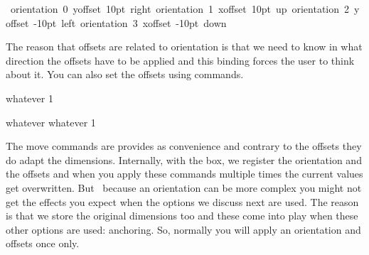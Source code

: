 \startbuffer
\hbox \bgroup \showboxes
          \hbox orientation 0 yoffset  10pt {right}
    \quad \hbox orientation 1 xoffset  10pt {up}
    \quad \hbox orientation 2 yoffset -10pt {left}
    \quad \hbox orientation 3 xoffset -10pt {down}
\egroup
\stopbuffer

\typebuffer[option=TEX]

\startlinecorrection
\getbuffer
\stoplinecorrection

The reason that offsets are related to orientation is that we need to know in
what direction the offsets have to be applied and this binding forces the user to
think about it. You can also set the offsets using commands.

\startbuffer
\setbox\scratchbox\hbox{whatever}%
1                                  \copy{} \boxorientation{}     \copy{} \boxxoffset    \scratchbox -15pt \copy{} \boxyoffset    \scratchbox -15pt \copy{}
\stopbuffer

\typebuffer[option=TEX]

\startlinecorrection
{}
\stoplinecorrection

\startbuffer
\setbox\scratchboxone\hbox{whatever}%
\setbox\scratchboxtwo\hbox{whatever}%
1 \boxxoffset \scratchboxone -15pt \copy{} \boxyoffset \scratchboxone -15pt \copy{} \boxxoffset \scratchboxone -15pt \copy{} \boxyoffset \scratchboxone -15pt \copy{} \boxxmove   \scratchboxtwo -15pt \copy{} \boxymove   \scratchboxtwo -15pt \copy{} \boxxmove   \scratchboxtwo -15pt \copy{} \boxymove   \scratchboxtwo -15pt \copy\scratchboxtwo
\stopbuffer

\typebuffer[option=TEX]

\startlinecorrection
{}
\stoplinecorrection

The move commands are provides as convenience and contrary to the offsets they do
adapt the dimensions. Internally, with the box, we register the orientation and
the offsets and when you apply these commands multiple times the current values
get overwritten. But \unknown\ because an orientation can be more complex you
might not get the effects you expect when the options we discuss next are used.
The reason is that we store the original dimensions too and these come into play
when these other options are used: anchoring. So, normally you will apply an
orientation and offsets once only.


